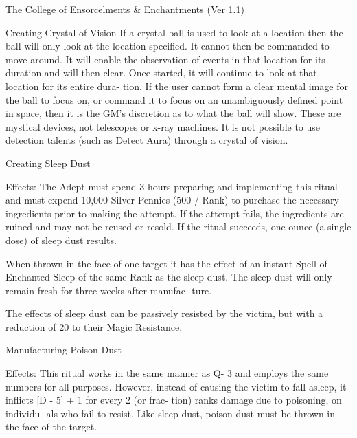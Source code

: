 \begin{Chapter}{The College of Ensorcelments \& Enchantments (Ver 1.1)}
\begin{ritual}[Q-2]{Creating Crystal of Vision }
If a crystal ball is used to look at a location then the 
ball  will  only  look  at  the  location  specified.  It 
cannot then be commanded to move around. It will 
enable the observation of events in that location for 
its duration and will then clear. Once started, it will 
continue to look at that location for its entire dura-
tion.  If  the  user  cannot  form a  clear  mental  image 
for the ball to focus on, or command it to focus on 
an unambiguously defined point in space, then it is 
the GM’s discretion as to what the ball  will show. 
These are mystical devices, not telescopes or x-ray 
machines. It is not possible to use detection talents 
(such as Detect Aura) through a crystal of vision. 
\end{ritual}

\begin{ritual}[Q-3]{Creating Sleep Dust }

Effects:  The  Adept  must  spend  3  hours  preparing 
and  implementing  this  ritual  and  must  expend 
10,000 Silver Pennies (500 / Rank) to purchase the 
necessary  ingredients  prior  to  making  the  attempt. 
If  the  attempt  fails,  the  ingredients  are  ruined  and 
may not be reused or resold. If the ritual succeeds, 
one ounce (a single dose) of sleep dust results. 

When  thrown  in  the  face  of  one  target  it  has  the 
effect of an instant Spell of Enchanted Sleep of the 
same  Rank  as  the  sleep  dust.  The  sleep  dust  will 
only  remain  fresh  for  three  weeks  after  manufac-
ture. 

The  effects  of  sleep  dust  can be  passively  resisted 
by  the  victim,  but  with  a  reduction  of  20  to  their 
Magic Resistance. 
\end{ritual}

\begin{ritual}[Q-4]{Manufacturing Poison Dust }

Effects: This ritual works in the same manner as Q-
3 and employs the same numbers for all purposes. 
However,  instead  of  causing  the  victim  to  fall 
asleep,  it  inflicts  [D  -  5]  +  1  for  every  2  (or  frac-
tion)  ranks  damage  due  to poisoning,  on  individu-
als  who  fail  to  resist.  Like  sleep  dust,  poison  dust 
must be thrown in the face of the target. 
\end{ritual}


\end{Chapter}
